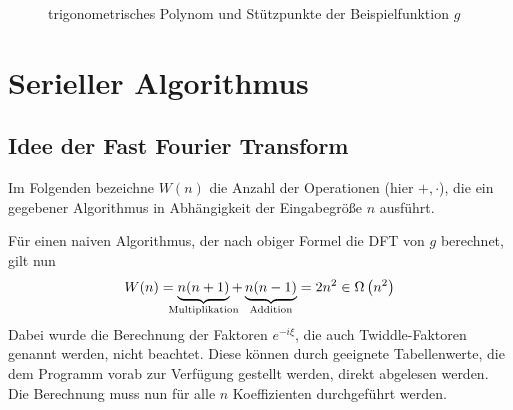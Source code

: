			\begin{figure}[h]
				\center
				
				\caption{trigonometrisches Polynom und Stützpunkte der Beispielfunktion $g$ }
				\label{fig:example}
			\end{figure}
			


	\section{Serieller Algorithmus} %
	\label{sec:serieller_algorithmus}

		\subsection{Idee der Fast Fourier Transform} %
		\label{sub:idee_der_fast_fourier_transform}
		
			Im Folgenden bezeichne $W(n)$ die Anzahl der Operationen (hier $+,\cdot$), die ein gegebener Algorithmus in Abhängigkeit der Eingabegröße $n$ ausführt.

			Für einen naiven Algorithmus, der nach obiger Formel die DFT von $g$ berechnet, gilt nun
			\[ W(n) = \underbrace{n(n+1)}_{\mathclap{\mathrm{Multiplikation}}} + \underbrace{n(n-1)}_{\mathclap{\mathrm{Addition}}} = 2n^2 \in \Omega\curvb{n^2} \]
			Dabei wurde die Berechnung der Faktoren $e^{-i\xi}$, die auch Twiddle-Faktoren genannt werden, nicht beachtet.
			Diese können durch geeignete Tabellenwerte, die dem Programm vorab zur Verfügung gestellt werden, direkt abgelesen werden.
			Die Berechnung muss nun für alle $n$ Koeffizienten durchgeführt werden.

